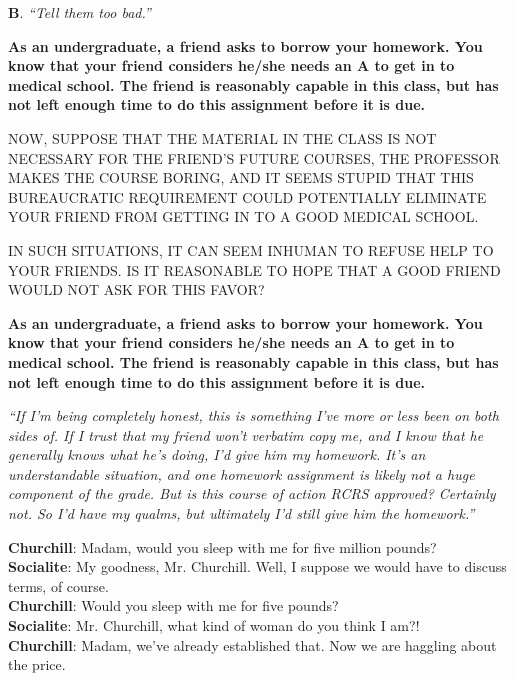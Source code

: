 \documentclass[portrait,11pt]{seminar}
\begin{document}
{\bf B}. {\it ``Tell them too bad.''}



\es
\bs

{\bf
As an undergraduate, a friend asks to borrow your homework. You know that your friend considers he/she needs an A to get in to medical school. The friend is reasonably capable in this class, but has not left enough time to do this assignment before it is due.
}
\medskip

NOW, SUPPOSE THAT THE MATERIAL IN THE CLASS IS NOT NECESSARY FOR THE FRIEND'S FUTURE COURSES, THE PROFESSOR MAKES THE COURSE BORING, AND IT SEEMS STUPID THAT THIS BUREAUCRATIC REQUIREMENT COULD POTENTIALLY ELIMINATE YOUR FRIEND FROM GETTING IN TO A GOOD MEDICAL SCHOOL. 

\medskip

IN SUCH SITUATIONS, IT CAN SEEM INHUMAN TO REFUSE HELP TO YOUR FRIENDS. IS IT REASONABLE TO HOPE THAT A GOOD FRIEND WOULD NOT ASK FOR THIS FAVOR? 






\es
\bs
{\bf As an undergraduate, a friend asks to borrow your homework. You know that your friend considers he/she needs an A to get in to medical school. The friend is reasonably capable in this class, but has not left enough time to do this assignment before it is due.}

{\it ``If I'm being completely honest, this is something I've more or less been on both sides of. If I trust that my friend won't verbatim copy me, and I know that he generally knows what he’s doing, I'd give him my homework. It's an understandable situation, and one homework assignment is likely not a huge component of the grade. But is this course of action RCRS approved? Certainly not. So I'd have my qualms, but ultimately I'd still give him the homework.''}

\es
\bs
{\bf Churchill}: Madam, would you sleep with me for five million pounds?\\
{\bf Socialite}: My goodness, Mr. Churchill. Well, I suppose we would have to discuss terms, of course.\\
{\bf Churchill}: Would you sleep with me for five pounds?\\
{\bf Socialite}: Mr. Churchill, what kind of woman do you think I am?!\\
{\bf Churchill}: Madam, we've already established that. Now we are haggling about the price.
\end{document}
